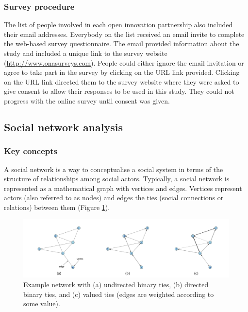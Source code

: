 \subsubsection{Survey procedure}

The list of people involved in each open innovation partnership also included their email addresses. Everybody on the list received an email invite to complete the web-based survey questionnaire. The email provided information about the study and included a unique link to the survey website (\url{http://www.onasurveys.com}). People could either ignore the email invitation or agree to take part in the survey by clicking on the URL link provided. Clicking on the URL link directed them to the survey website where they were asked to give consent to allow their responses to be used in this study. They could not progress with the online survey until consent was given.

\subsection{Social network analysis}

\subsubsection{Key concepts}

A social network is a way to conceptualise a social system in terms of the structure of relationships among social actors. Typically, a social network is represented as a mathematical graph with vertices and edges. Vertices represent actors (also referred to as nodes) and edges the ties (social connections or relations) between them (Figure \ref{fig:examples}). \medskip

\begin{figure}
    \centering
    \includegraphics[width=1.0\linewidth]{Images/example_networks.png}
    \caption[Example networks]{Example network with (a) undirected binary ties, (b) directed binary ties, and (c) valued ties (edges are weighted according to some value).}
    \label{fig:examples}
\end{figure}

